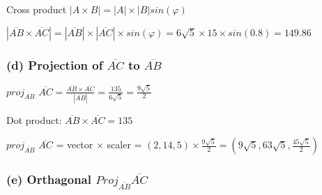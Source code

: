 \documentclass[12pt,a4paper]{article}
\begin{document}
\noindent Cross product $|A \times B| = |A| \times |B| sin(\varphi)$
\newline

\noindent $|\overline{AB} \times \overline{AC}| = |\overline{AB}| \times |\overline{AC}| \times sin(\varphi) = 6\sqrt{5} \times 15 \times sin(0.8) = 149.86$

\subsubsection*{(d) Projection of $\overline{AC}$ to $\overline{AB}$}

$proj_{\overline{AB}}$ $\overline{AC} = \frac{\overline{AB} \times \overline{AC}}{|\overline{AB}|} = \frac{135}{6\sqrt{5}} = \frac{9\sqrt{5}}{2}$

\noindent Dot product: $\overline{AB} \times \overline{AC} = 135$

\noindent $proj_{\overline{AB}}$ $\overline{AC}$ = vector $\times$ scaler = $(2, 14, 5) \times \frac{9\sqrt{5}}{2} = (9\sqrt{5}, 63 \sqrt{5}, \frac{45 \sqrt{5}}{2})$

\subsubsection*{(e) Orthagonal $Proj_{\overline{AB}} \overline{AC}$}
\end{document}
